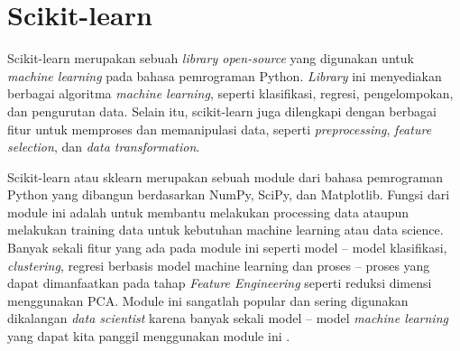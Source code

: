 \section{Scikit-learn}
Scikit-learn merupakan sebuah \textit{library open-source} yang digunakan untuk \textit{machine learning} pada bahasa pemrograman Python. \textit{Library} ini menyediakan berbagai algoritma \textit{machine learning}, seperti klasifikasi, regresi, pengelompokan, dan pengurutan data. Selain itu, scikit-learn juga dilengkapi dengan berbagai fitur untuk memproses dan memanipulasi data, seperti \textit{preprocessing}, \textit{feature selection}, dan \textit{data transformation}.

Scikit-learn atau sklearn merupakan sebuah module dari bahasa pemrograman Python yang dibangun berdasarkan NumPy, SciPy, dan Matplotlib. Fungsi dari module ini adalah untuk membantu melakukan processing data ataupun melakukan training data untuk kebutuhan machine learning atau data science. Banyak sekali fitur yang ada pada module ini seperti model – model klasifikasi, \textit{clustering}, regresi berbasis model machine learning dan proses – proses yang dapat dimanfaatkan pada tahap \textit{Feature Engineering} seperti reduksi dimensi menggunakan PCA. Module ini sangatlah popular dan sering digunakan dikalangan \textit{data scientist} karena banyak sekali model – model \textit{machine learning} yang dapat kita panggil menggunakan module ini \cite{bisaai2024scikit}.

